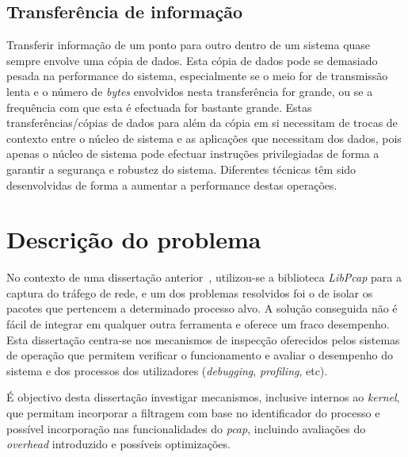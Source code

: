 \subsection{Transferência de informação}\label{sect:transf_information}


Transferir informação de um ponto para outro dentro de um sistema quase sempre envolve uma cópia de dados. Esta cópia de dados pode se demasiado pesada na performance do sistema, especialmente se o meio for de transmissão lenta e o número de \textit{bytes} envolvidos nesta transferência for grande, ou se a frequência com que esta é efectuada for bastante grande. Estas transferências/cópias de dados para além da cópia em si necessitam de trocas de contexto entre o núcleo de sistema e as aplicações que necessitam dos dados, pois apenas o núcleo de sistema pode efectuar instruções privilegiadas de forma a garantir a segurança e robustez do sistema. Diferentes técnicas têm sido desenvolvidas de forma a aumentar a performance destas operações. 


\section{Descrição do problema} \label{sect:descricao_prob}
 No contexto de uma dissertação anterior~\cite{Farruca:2009}, utilizou-se a biblioteca \textit{LibPcap} para a captura do tráfego de rede, e um dos problemas resolvidos foi o de isolar os pacotes que pertencem a determinado processo alvo. A solução conseguida não é fácil de integrar em qualquer outra ferramenta e oferece um fraco desempenho.
Esta dissertação centra-se nos mecanismos de inspecção oferecidos pelos sistemas de operação que permitem verificar o funcionamento e avaliar o desempenho do sistema e dos processos dos utilizadores (\textit{debugging}, \textit{profiling}, etc).

É objectivo desta dissertação investigar mecanismos, inclusive internos ao \textit{kernel}, que permitam incorporar a filtragem com base no identificador do processo e possível incorporação nas funcionalidades do \textit{pcap}, incluindo avaliações do \textit{overhead} introduzido e possíveis optimizações.

